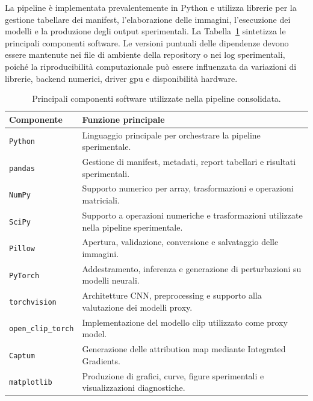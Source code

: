 La pipeline è implementata prevalentemente in Python e utilizza librerie per la gestione tabellare dei manifest, l'elaborazione delle immagini, l'esecuzione dei modelli e la produzione degli output sperimentali. La Tabella~\ref{tab:software-environment} sintetizza le principali componenti software. Le versioni puntuali delle dipendenze devono essere mantenute nei file di ambiente della repository o nei log sperimentali, poiché la riproducibilità computazionale può essere influenzata da variazioni di librerie, backend numerici, driver \gls{gpu} e disponibilità hardware.

\begin{table}[H]
\centering
\caption{Principali componenti software utilizzate nella pipeline consolidata.}
\label{tab:software-environment}
\begin{tabularx}{\textwidth}{@{}lX@{}}
\toprule
\textbf{Componente} & \textbf{Funzione principale} \\
\midrule
\texttt{Python} & Linguaggio principale per orchestrare la pipeline sperimentale. \\
\texttt{pandas} & Gestione di manifest, metadati, report tabellari e risultati sperimentali. \\
\texttt{NumPy} & Supporto numerico per array, trasformazioni e operazioni matriciali. \\
\texttt{SciPy} & Supporto a operazioni numeriche e trasformazioni utilizzate nella pipeline sperimentale. \\
\texttt{Pillow} & Apertura, validazione, conversione e salvataggio delle immagini. \\
\texttt{PyTorch} & Addestramento, inferenza e generazione di perturbazioni su modelli neurali. \\
\texttt{torchvision} & Architetture CNN, preprocessing e supporto alla valutazione dei modelli proxy. \\
\texttt{open\_clip\_torch} & Implementazione del modello \gls{clip} utilizzato come proxy model. \\
\texttt{Captum} & Generazione delle attribution map mediante Integrated Gradients. \\
\texttt{matplotlib} & Produzione di grafici, curve, figure sperimentali e visualizzazioni diagnostiche. \\
\bottomrule
\end{tabularx}
\end{table}

